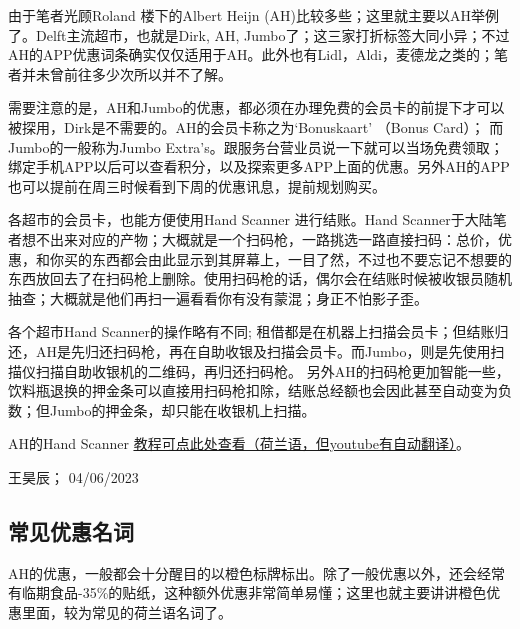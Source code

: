 由于笔者光顾Roland 楼下的Albert Heijn (AH)比较多些；这里就主要以AH举例了。Delft主流超市，也就是Dirk, AH, Jumbo了；这三家打折标签大同小异；不过AH的APP优惠词条确实仅仅适用于AH。此外也有Lidl，Aldi，麦德龙之类的；笔者并未曾前往多少次所以并不了解。

需要注意的是，AH和Jumbo的优惠，都必须在办理免费的会员卡的前提下才可以被探用，Dirk是不需要的。AH的会员卡称之为‘Bonuskaart’ （Bonus Card）； 而Jumbo的一般称为Jumbo Extra's。跟服务台营业员说一下就可以当场免费领取；绑定手机APP以后可以查看积分，以及探索更多APP上面的优惠。另外AH的APP也可以提前在周三时候看到下周的优惠讯息，提前规划购买。

各超市的会员卡，也能方便使用Hand Scanner 进行结账。Hand Scanner于大陆笔者想不出来对应的产物；大概就是一个扫码枪，一路挑选一路直接扫码：总价，优惠，和你买的东西都会由此显示到其屏幕上，一目了然，不过也不要忘记不想要的东西放回去了在扫码枪上删除。使用扫码枪的话，偶尔会在结账时候被收银员随机抽查；大概就是他们再扫一遍看看你有没有蒙混；身正不怕影子歪。

各个超市Hand Scanner的操作略有不同; 租借都是在机器上扫描会员卡；但结账归还，AH是先归还扫码枪，再在自助收银及扫描会员卡。而Jumbo，则是先使用扫描仪扫描自助收银机的二维码，再归还扫码枪。 另外AH的扫码枪更加智能一些，饮料瓶退换的押金条可以直接用扫码枪扣除，结账总经额也会因此甚至自动变为负数；但Jumbo的押金条，却只能在收银机上扫描。

AH的Hand Scanner \href{https://www.youtube.com/watch?v=7MSqE_vt5Po}{\uline{教程可点此处查看（荷兰语，但youtube有自动翻译）}}。
\begin{flushright}
王昊辰； 04/06/2023
\end{flushright}



\subsection{常见优惠名词}
AH的优惠，一般都会十分醒目的以橙色标牌标出。除了一般优惠以外，还会经常有临期食品-35\%的贴纸，这种额外优惠非常简单易懂；这里也就主要讲讲橙色优惠里面，较为常见的荷兰语名词了。

